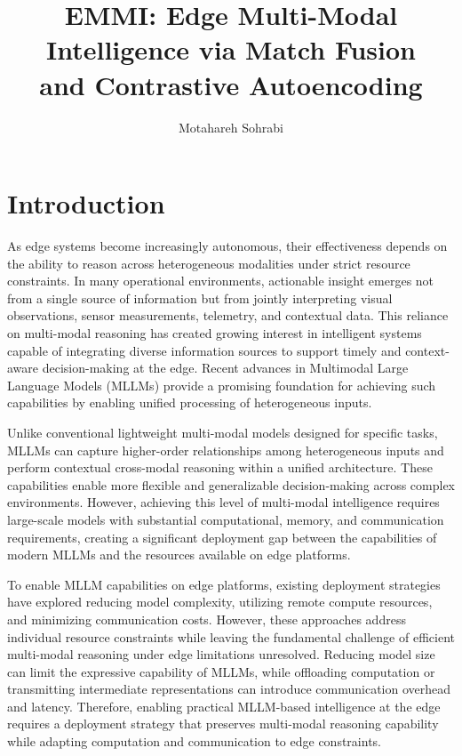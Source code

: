 \documentclass[10pt,twocolumn]{article}
\title{\textbf{EMMI: Edge Multi-Modal Intelligence via Match Fusion\\and Contrastive Autoencoding}}
\author{Motahareh Sohrabi}
\date{}
\begin{document}
\maketitle

\section{Introduction}

As edge systems become increasingly autonomous, their
effectiveness depends on the ability to reason across heterogeneous modalities under strict resource constraints. In
many operational environments, actionable insight emerges not
from a single source of information but from jointly interpreting visual observations, sensor measurements, telemetry,
and contextual data. This reliance on multi-modal reasoning
has created growing interest in intelligent systems capable of
integrating diverse information sources to support timely and
context-aware decision-making at the edge. Recent advances
in Multimodal Large Language Models (MLLMs) provide
a promising foundation for achieving such capabilities by
enabling unified processing of heterogeneous inputs.

Unlike conventional lightweight multi-modal models designed for specific tasks, MLLMs can capture higher-order
relationships among heterogeneous inputs and perform contextual cross-modal reasoning within a unified architecture. These
capabilities enable more flexible and generalizable decision-making across complex environments. However, achieving this
level of multi-modal intelligence requires large-scale models
with substantial computational, memory, and communication
requirements, creating a significant deployment gap between
the capabilities of modern MLLMs and the resources available
on edge platforms.

To enable MLLM capabilities on edge platforms, existing
deployment strategies have explored reducing model complexity, utilizing remote compute resources, and minimizing
communication costs. However, these approaches address individual resource constraints while leaving the fundamental
challenge of efficient multi-modal reasoning under edge limitations unresolved. Reducing model size can limit the expressive capability of MLLMs, while offloading computation or
transmitting intermediate representations can introduce communication overhead and latency. Therefore, enabling practical
MLLM-based intelligence at the edge requires a deployment
strategy that preserves multi-modal reasoning capability while
adapting computation and communication to edge constraints.
\end{document}
